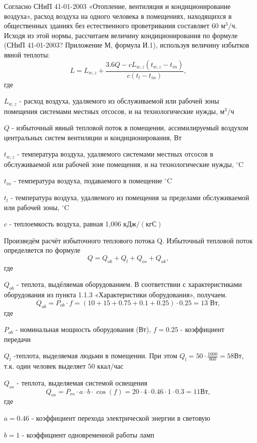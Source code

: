 Согласно СНиП 41-01-2003 «Отопление, вентиляция и кондиционирование воздуха», расход воздуха на одного человека в помещениях, находящихся в общественных зданиях без естественного проветривания составляет 60 м$^3$/ч. Исходя из этой нормы, рассчитаем величину кондиционирования по формуле (СНиП 41-01-2003? Приложение М, формула И.1), используя величину из\-бытков явной теплоты:
$$
L = L_{w,z} + \frac{3.6Q - cL_{w,z}(t_{w,z} - t_{in})}{c(t_{l}-t_{in})},
$$
где

$L_{w,z}$ - расход воздуха, удаляемого из обслуживаемой или рабочей зоны помещения системами местных отсосов, и на технологические нужды,  $\mbox{м}^3/\mbox{ч}$

$Q$ - избыточный явный тепловой поток в помещении, ассимилируемый воздухом центральных систем вентиляции и кондиционирования, Вт

$t_{w,z}$ - температура воздуха, удаляемого системами местных отсосов в об\-служиваемой или рабочей зоне помещения, и на технологические нужды, $^\circ$C

$t_{in}$ - температура воздуха, подаваемого в помещение $^\circ$C

$t_{l}$ - температура воздуха, удаляемого из помещения за пределами обслу\-живаемой или рабочей зоны, $^\circ$C

$c$ - теплоемкость воздуха, равная 1,006 $\mbox{кДж}/(\mbox{кгС})$

Произведём расчёт избыточного теплового потока Q. Избыточный тепло\-вой поток определяется по формуле
$$
Q = Q_{ob} + Q_{l} + Q_{os} + Q_{ok},
$$
где 

$Q_{ob}$ - теплота, выдёляемая оборудованием. В соответствии с характерис\-тиками обору\-дования из пункта 1.1.3 «Характеристики оборудования», по\-лучаем.
$$
Q_{ob} = P_{ob}\cdot f = (10+15+0.75+0.1+0.25)\cdot 0.25 = 13 \mbox{ Вт},
$$
где

$P_{ob}$ - номинальная мощность оборудования (Вт), $f=0.25$ - коэффициент передачи

 $Q_{l}$ -теплота, выделяемая людьми в помещении. При этом $Q_{l} = 50\cdot \frac{1000}{860} = 58 \mbox{Вт}$, т.к. один человек выделяет $50 \mbox{ ккал/час}$

$Q_{os}$ - теплота, выделяемая системой освещения
$$
Q_{os} = P_{os} \cdot a \cdot b \cdot \cos(f) = 20 \cdot 4 \cdot 0.46 \cdot 1 \cdot 0.3 = 11 \mbox{Вт},
$$
где

$a = 0.46$ - коэффициент перехода электрической энергии в световую

$b = 1$ -  коэффициент одновременной работы ламп

